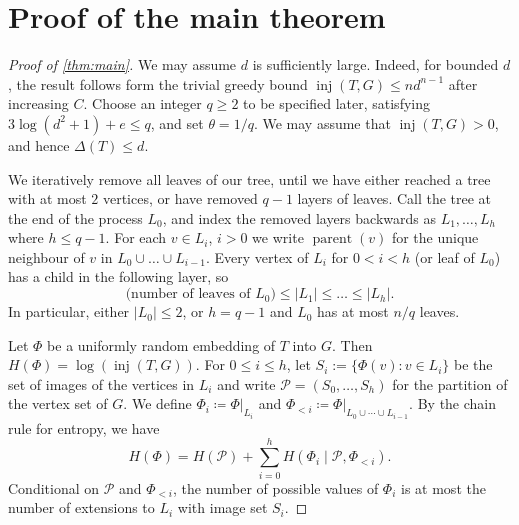 \documentclass[10pt,a4paper]{amsart}
\numberwithin{equation}{section}
\theoremstyle{definition}
\theoremstyle{remark}
\DeclareMathOperator{\parent}{parent}
\DeclareMathOperator{\inj}{inj}
\begin{document}
\section{Proof of the main theorem}\label{sec:proof}
\begin{proof}[Proof of \cref{thm:main}] We may assume $d$ is sufficiently large.
Indeed, for bounded $d$, the result follows form the trivial greedy bound $\inj(T,G)\leq nd^{n-1}$ after increasing $C$.
Choose an integer $q\geq 2$ to be specified later, satisfying $3\log(d^2+1)+e\le q$, and set $\theta = 1/q$. We may assume that $\inj(T,G)>0$, and hence $\Delta(T)\le d$.

We iteratively remove all leaves of our tree, until we have either reached a tree with at most $2$ vertices, or have removed $q-1$ layers of leaves. Call the tree at the end of the process $L_0$, and index the removed layers backwards as $L_1,\dots,L_h$ where $h\leq q-1$. For each $v\in L_i$, $i>0$ we write $\parent(v)$ for the unique neighbour of $v$ in $L_0\cup\dots \cup L_{i-1}$. Every vertex of $L_i$ for $0<i<h$ (or leaf of $L_0$) has a child in the following layer, so
$$\text{(number of leaves of $L_0$)}\leq |L_1|\leq \dots \leq |L_h|.$$
In particular, either $|L_0|\leq 2$, or $h=q-1$ and $L_0$ has at most $n/q$ leaves.

Let $\Phi$ be a uniformly random embedding of $T$ into $G$. Then $H(\Phi)=\log(\inj(T,G))$. For $0\leq i\leq h$, let $S_i:=\{\Phi(v):v\in L_i\}$ be the set of images of the vertices in $L_i$ and write $\mathcal{P}=(S_0,\dots , S_h)$ for the partition of the vertex set of $G$. We define $\Phi_i\coloneqq \Phi|_{L_i}$ and $\Phi_{<i}\coloneqq \Phi|_{L_0\cup\cdots\cup L_{i-1}}
$.
By the chain rule for entropy, we have
$$H(\Phi)=H(\mathcal{P})+\sum_{i=0}^{h}H(\Phi_i\mid\mathcal{P},\Phi_{<i}).$$
Conditional on $\mathcal P$ and $\Phi_{<i}$, the number of possible
values of $\Phi_i$ is at most the number of extensions to $L_i$
with image set $S_i$. 


\end{proof}
\end{document}
